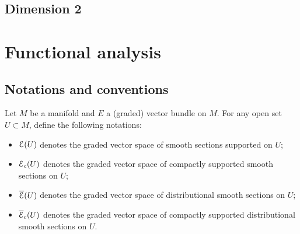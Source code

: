 \documentclass[10pt, oneside]{article}
\begin{document}
%


\subsection{Dimension 2}



\appendix

\section{Functional analysis} \label{appx: top}

\def\CVS{{\rm CVS}}
\def\DVS{{\rm DVS}}


\subsection{Notations and conventions}

\begin{definition}
Let $M$ be a manifold and $E$ a (graded) vector bundle on $M$.  
For any open set $U \subset M$, define the following notations:
\begin{itemize}
\item $\mathcal E(U)$ denotes the graded vector space of smooth sections supported on $U$;
\item $\mathcal E_c(U)$ denotes the graded vector space of compactly supported smooth sections on $U$;
\item $\overline{\mathcal E}(U)$ denotes the graded vector space of distributional smooth sections on $U$;
\item $\overline{\mathcal E}_c(U)$ denotes the graded vector space of compactly supported distributional smooth sections on $U$.
\end{itemize}
\end{definition}
\end{document}
